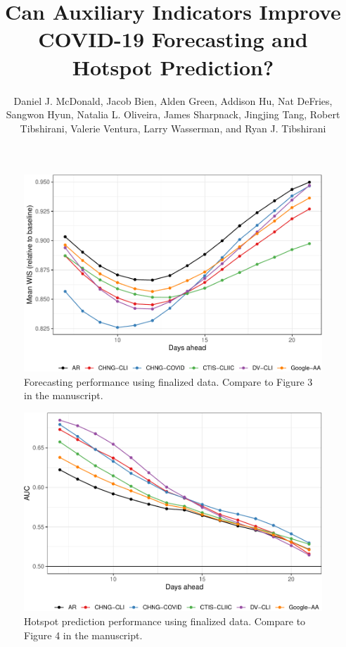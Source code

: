 \documentclass[9pt,twoside,lineno]{pnas-new}
\title{Can Auxiliary Indicators Improve COVID-19 Forecasting and Hotspot  
  Prediction?}
\author{Daniel J. McDonald, Jacob Bien, Alden Green, Addison Hu, Nat DeFries,
  Sangwon Hyun, Natalia L. Oliveira, James Sharpnack, Jingjing Tang, Robert
  Tibshirani, Valerie Ventura, Larry Wasserman, and Ryan J. Tibshirani}
\begin{document}
\maketitle


\SItext





\begin{figure}

{\centering \includegraphics[width=\textwidth]{fig/fcast-finalized-1} 

}

\caption{Forecasting performance using finalized data. Compare to Figure 3 in the manuscript.}\label{fig:fcast-finalized}
\end{figure}

\clearpage

\begin{figure}

{\centering \includegraphics[width=\textwidth]{fig/hot-finalized-1} 

}

\caption{Hotspot prediction performance using finalized data. Compare to Figure 4 in the manuscript.}\label{fig:hot-finalized}
\end{figure}
\end{document}
